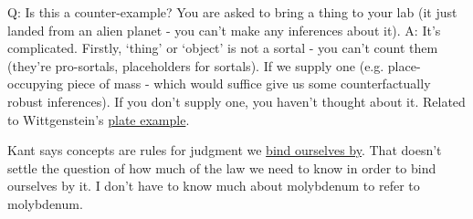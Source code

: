 Q: Is this a counter-example? You are asked to bring a thing to your lab (it just landed from an alien planet - you can't make any inferences about it).
A: It's complicated. Firstly, `thing' or `object' is not a sortal - you can't count them (they're pro-sortals, placeholders for sortals). If we supply one (e.g. place-occupying piece of mass - which would suffice give us some counterfactually robust inferences). If you don't supply one, you haven't thought about it. Related to Wittgenstein's \href{doc/phil/Phil Situations/Plate pointing}{plate example}.

Kant says concepts are rules for judgment we \href{doc/phil/People/Brandom/Slogans/Concepts}{bind ourselves by}. That doesn't settle the question of how much of the law we need to know in order to bind ourselves by it. I don't have to know much about molybdenum to refer to molybdenum.



